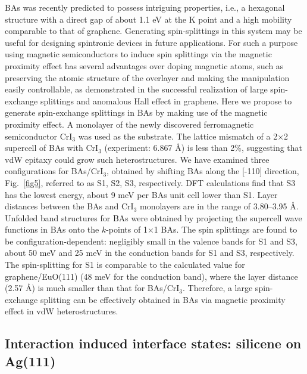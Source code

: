 \documentclass[aps,prb,showpacs,twocolumn,reprint,superscriptaddress]{revtex4-1}
\begin{document}
BAs was recently predicted to possess intriguing properties, i.e., a hexagonal structure with a direct gap of about 1.1 eV at the K point 
and a high mobility comparable to that of graphene. \cite{Xie2016Two}
Generating spin-splittings in this system may be useful for designing spintronic devices in future applications.
For such a purpose using magnetic semiconductors to induce spin splittings via the magnetic proximity effect 
has several advantages over doping magnetic atoms, such as preserving the atomic structure of the overlayer and
making the manipulation easily controllable, as demonstrated in the 
successful realization of large spin-exchange splittings and anomalous Hall effect in graphene.\cite{Wei2016,Wang2015}
Here we propose to generate spin-exchange splittings in BAs by making use of the magnetic proximity effect. 
A monolayer of the newly discovered ferromagnetic semiconductor CrI$_3$ was used as the substrate. 
The lattice mismatch of a
2$\times$2 supercell of BAs with CrI$_3$ (experiment: 6.867 \AA) is less than 2\%,
suggesting that vdW epitaxy could grow such heterostructures.  We have examined three configurations for
BAs/CrI$_3$, obtained by shifting BAs along the [-110] direction, Fig.~\ref{fig5}, referred to as S1, S2, S3,
respectively.  DFT calculations find that S3 has the lowest energy, about 9 meV per BAs unit cell lower than
S1.  Layer distances between the BAs and CrI$_3$ monolayers are in the range of 3.80--3.95 \AA.  Unfolded band
structures for BAs were obtained by projecting the supercell wave functions in BAs onto the $k$-points of
1$\times$1 BAs.  The spin splittings are found to be configuration-dependent: negligibly small in the valence
bands for S1 and S3, about 50 meV and 25 meV in the conduction bands for S1 and S3, respectively.  The
spin-splitting for S1 is comparable to the calculated value for graphene/EuO(111) (48 meV for the conduction band),\cite{Hallal2017} 
where the layer distance (2.57 \AA) is much smaller than that for BAs/CrI$_3$. 
Therefore, a large spin-exchange splitting can be
effectively obtained in BAs via magnetic proximity effect in vdW heterostructures. 

\subsection{Interaction induced interface states: silicene on Ag(111)}
\end{document}

